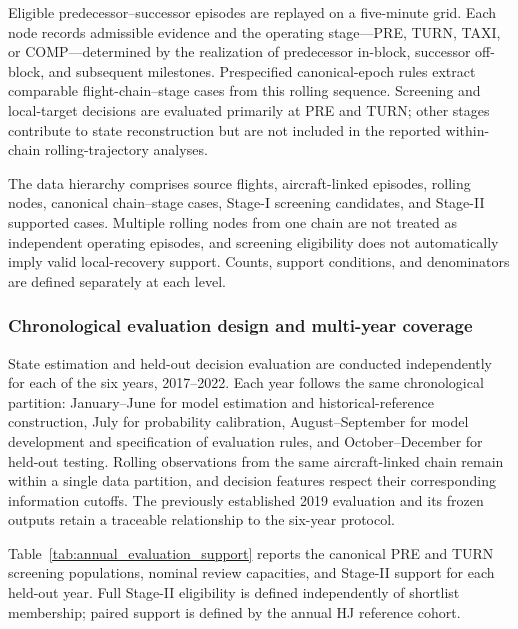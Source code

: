 Eligible predecessor--successor episodes are replayed on a five-minute grid. Each node records admissible evidence and the operating stage---PRE, TURN, TAXI, or COMP---determined by the realization of predecessor in-block, successor off-block, and subsequent milestones. Prespecified canonical-epoch rules extract comparable flight-chain--stage cases from this rolling sequence. Screening and local-target decisions are evaluated primarily at PRE and TURN; other stages contribute to state reconstruction but are not included in the reported within-chain rolling-trajectory analyses.

The data hierarchy comprises source flights, aircraft-linked episodes, rolling nodes, canonical chain--stage cases, Stage-I screening candidates, and Stage-II supported cases. Multiple rolling nodes from one chain are not treated as independent operating episodes, and screening eligibility does not automatically imply valid local-recovery support. Counts, support conditions, and denominators are defined separately at each level.

\subsubsection{Chronological evaluation design and multi-year coverage}
\label{subsubsec:temporal_design}

State estimation and held-out decision evaluation are conducted independently for each of the six years, 2017--2022. Each year follows the same chronological partition: January--June for model estimation and historical-reference construction, July for probability calibration, August--September for model development and specification of evaluation rules, and October--December for held-out testing. Rolling observations from the same aircraft-linked chain remain within a single data partition, and decision features respect their corresponding information cutoffs. The previously established 2019 evaluation and its frozen outputs retain a traceable relationship to the six-year protocol.

Table~\ref{tab:annual_evaluation_support} reports the canonical PRE and TURN screening populations, nominal review capacities, and Stage-II support for each held-out year. Full Stage-II eligibility is defined independently of shortlist membership; paired support is defined by the annual HJ reference cohort.

